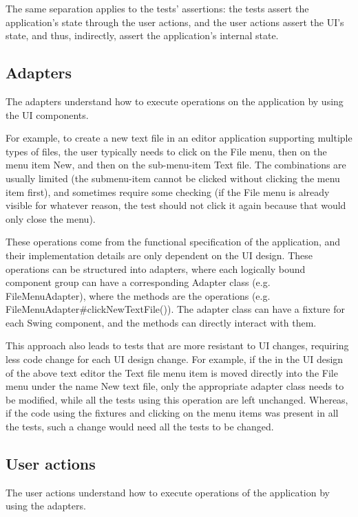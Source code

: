 The same separation applies to the tests' assertions: the tests assert the application's state through the user actions, and the user actions assert the UI's state, and thus, indirectly, assert the application's internal state.

\subsection{Adapters}

The adapters understand how to execute operations on the application by using the UI components. 

For example, to create a new text file in an editor application supporting multiple types of files, the user typically needs to click on the File menu, then on the menu item New, and then on the sub-menu-item Text file. The combinations are usually limited (the submenu-item cannot be clicked without clicking the menu item first), and sometimes require some checking (if the File menu is already visible for whatever reason, the test should not click it again because that would only close the menu).

These operations come from the functional specification of the application, and their implementation details are only dependent on the UI design. These operations can be structured into adapters, where each logically bound component group can have a corresponding Adapter class (e.g. FileMenuAdapter), where the methods are the operations (e.g. FileMenuAdapter\#clickNewTextFile()). The adapter class can have a fixture for each Swing component, and the methods can directly interact with them.

This approach also leads to tests that are more resistant to UI changes, requiring less code change for each UI design change. For example, if the in the UI design of the above text editor the Text file menu item is moved directly into the File menu under the name New text file, only the appropriate adapter class needs to be modified, while all the tests using this operation are left unchanged. Whereas, if the code using the fixtures and clicking on the menu items was present in all the tests, such a change would need all the tests to be changed.

\subsection {User actions}

The user actions understand how to execute operations of the application by using the adapters. 

